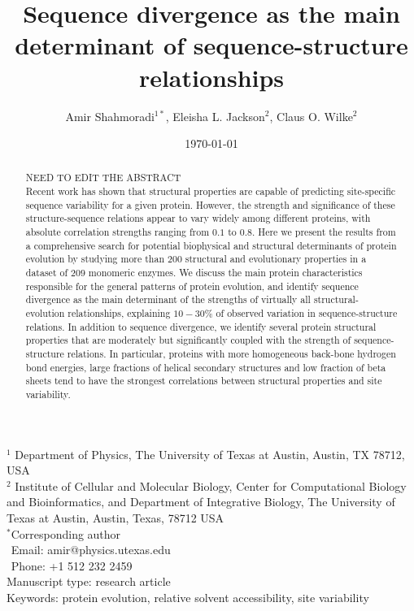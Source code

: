 \documentclass[12pt]{article}
\title{Sequence divergence as the main determinant of sequence-structure relationships}
\author{Amir Shahmoradi$^{1*}$, Eleisha L. Jackson$^2$, Claus O. Wilke$^2$}
\begin{document}
\date{\today}
\maketitle


\noindent
$^1$ Department of Physics, The University of Texas at Austin, Austin, TX 78712, USA \\
$^2$ Institute of Cellular and Molecular Biology, Center for Computational Biology and Bioinformatics, and Department of Integrative Biology, The University of Texas at Austin, Austin, Texas, 78712 USA\\

\bigskip
\noindent
$^*$Corresponding author\\
$\phantom{^*}$Email: amir@physics.utexas.edu\\
$\phantom{^*}$Phone: +1 512 232 2459\\

\bigskip
\noindent
Manuscript type: research article\\
\bigskip
\noindent  Keywords: protein evolution, relative solvent accessibility, site variability


\begin{abstract}
NEED TO EDIT THE ABSTRACT\\
Recent work has shown that structural properties are capable of predicting site-specific sequence variability for a given protein. However, the strength and significance of these structure-sequence relations appear to vary widely among different proteins, with absolute correlation strengths ranging from $0.1$ to $0.8$.  Here we present the results from a comprehensive search for potential biophysical and structural determinants of protein evolution by studying more than $200$ structural and evolutionary properties in a dataset of $209$ monomeric enzymes. We discuss the main protein characteristics responsible for the general patterns of protein evolution, and identify sequence divergence as the main determinant of the strengths of virtually all structural-evolution relationships, explaining $10-30 \%$ of observed variation in sequence-structure relations. In addition to sequence divergence, we identify several protein structural properties that are moderately but significantly coupled with the strength of sequence-structure relations. In particular, proteins with more homogeneous back-bone hydrogen bond energies, large fractions of helical secondary structures and low fraction of beta sheets tend to have the strongest correlations between structural properties and site variability. 

\end{abstract}
\vfill
\vfill
\def\thefootnote{\fnsymbol{footnote}}
\setcounter{footnote}{0}
\end{document}
